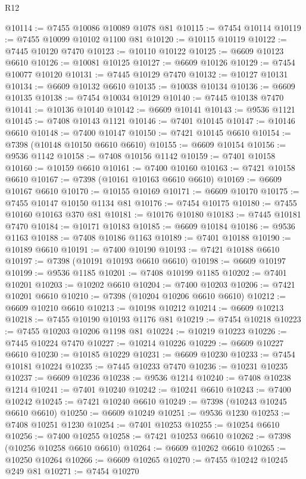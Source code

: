 \begin{lexlean}{R12}
\begin{coremodule}
{{{{{{{{{{{{{{{{{{{{{{{{{{{{{{{{{{{{{{{{{{{{{{{{{{{{{{{{{{{{{{{{{{{{{{{{{{{{{{{{{{@10114 := @7455 @10086 @10089 @1078 @81
@10115 := @7454 @10114
@10119 := @7455 @10099 @10102 @1100 @81
@10120 := @10115 @10119
@10122 := @7445 @10120 @7470
@10123 := @10110 @10122
@10125 := @6609 @10123 @6610
@10126 := @10081 @10125
@10127 := @6609 @10126
@10129 := @7454 @10077 @10120
@10131 := @7445 @10129 @7470
@10132 := @10127 @10131
@10134 := @6609 @10132 @6610
@10135 := @10038 @10134
@10136 := @6609 @10135
@10138 := @7454 @10034 @10129
@10140 := @7445 @10138 @7470
@10141 := @10136 @10140
@10142 := @6609 @10141
@10143 := @9536 @1121
@10145 := @7408 @10143 @1121
@10146 := @7401 @10145
@10147 := @10146 @6610
@10148 := @7400 @10147
@10150 := @7421 @10145 @6610
@10154 := @7398 (@10148 @10150 @6610 @6610)
@10155 := @6609 @10154
@10156 := @9536 @1142
@10158 := @7408 @10156 @1142
@10159 := @7401 @10158
@10160 := @10159 @6610
@10161 := @7400 @10160
@10163 := @7421 @10158 @6610
@10167 := @7398 (@10161 @10163 @6610 @6610)
@10169 := @6609 @10167 @6610
@10170 := @10155 @10169
@10171 := @6609 @10170
@10175 := @7455 @10147 @10150 @1134 @81
@10176 := @7454 @10175
@10180 := @7455 @10160 @10163 @370 @81
@10181 := @10176 @10180
@10183 := @7445 @10181 @7470
@10184 := @10171 @10183
@10185 := @6609 @10184
@10186 := @9536 @1163
@10188 := @7408 @10186 @1163
@10189 := @7401 @10188
@10190 := @10189 @6610
@10191 := @7400 @10190
@10193 := @7421 @10188 @6610
@10197 := @7398 (@10191 @10193 @6610 @6610)
@10198 := @6609 @10197
@10199 := @9536 @1185
@10201 := @7408 @10199 @1185
@10202 := @7401 @10201
@10203 := @10202 @6610
@10204 := @7400 @10203
@10206 := @7421 @10201 @6610
@10210 := @7398 (@10204 @10206 @6610 @6610)
@10212 := @6609 @10210 @6610
@10213 := @10198 @10212
@10214 := @6609 @10213
@10218 := @7455 @10190 @10193 @1176 @81
@10219 := @7454 @10218
@10223 := @7455 @10203 @10206 @1198 @81
@10224 := @10219 @10223
@10226 := @7445 @10224 @7470
@10227 := @10214 @10226
@10229 := @6609 @10227 @6610
@10230 := @10185 @10229
@10231 := @6609 @10230
@10233 := @7454 @10181 @10224
@10235 := @7445 @10233 @7470
@10236 := @10231 @10235
@10237 := @6609 @10236
@10238 := @9536 @1214
@10240 := @7408 @10238 @1214
@10241 := @7401 @10240
@10242 := @10241 @6610
@10243 := @7400 @10242
@10245 := @7421 @10240 @6610
@10249 := @7398 (@10243 @10245 @6610 @6610)
@10250 := @6609 @10249
@10251 := @9536 @1230
@10253 := @7408 @10251 @1230
@10254 := @7401 @10253
@10255 := @10254 @6610
@10256 := @7400 @10255
@10258 := @7421 @10253 @6610
@10262 := @7398 (@10256 @10258 @6610 @6610)
@10264 := @6609 @10262 @6610
@10265 := @10250 @10264
@10266 := @6609 @10265
@10270 := @7455 @10242 @10245 @249 @81
@10271 := @7454 @10270
}}}}}}}}}}}}}}}}}}}}}}}}}}}}}}}}}}}}}}}}}}}}}}}}}}}}}}}}}}}}}}}}}}}}}}}}}}}}}}}}}}
\end{coremodule}
\end{lexlean}
